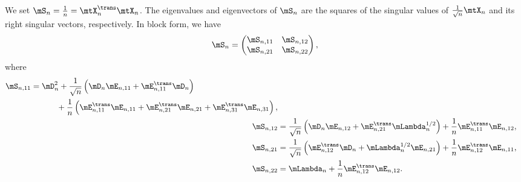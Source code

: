 We set $\mS_n = \frac{1}{n} = \mtX_n^\trans \mtX_n$.  The eigenvalues and eigenvectors of $\mS_n$ are the squares of the singular values of $\frac{1}{\sqrt{n}} \mtX_n$ and its right singular vectors, respectively.  In block form, we have
\[
    \mS_n
    =
    \left(
    \begin{matrix}
        \mS_{n,11} & \mS_{n,12} \\
        \mS_{n,21} & \mS_{n,22}
    \end{matrix}
    \right),
\]
where
\begin{align*}
    \begin{split}
    \mS_{n,11}
        &=
            \mD_n^2 
            + 
            \frac{1}{\sqrt{n}} 
            \left( 
                \mD_n \mE_{n,11} + \mE_{n,11}^\trans \mD_n
            \right) \\
            &\phantom{= \mD_n^2} +
            \frac{1}{n}
            \left(
                \mE_{n,11}^\trans \mE_{n,11}
                +
                \mE_{n,21}^\trans \mE_{n,21}
                +
                \mE_{n,31}^\trans \mE_{n,31}
            \right),
    \end{split} \\
    \mS_{n,12}
        &=
            \frac{1}{\sqrt{n}}
            \left(
                \mD_n \mE_{n,12} + \mE_{n,21}^\trans \mLambda_n^{1/2}
            \right)
            +
            \frac{1}{n}
            \mE_{n,11}^\trans \mE_{n,12}, \\
    \mS_{n,21}
        &=
            \frac{1}{\sqrt{n}}
            \left(
                \mE_{n,12}^\trans \mD_n
                +
                \mLambda_n^{1/2} \mE_{n,21}
            \right)
            +
            \frac{1}{n}
            \mE_{n,12}^\trans \mE_{n,11}, \\
    \mS_{n,22}
        &=
            \mLambda_n
            +
            \frac{1}{n}
            \mE_{n,12}^\trans \mE_{n,12}.
\end{align*}

